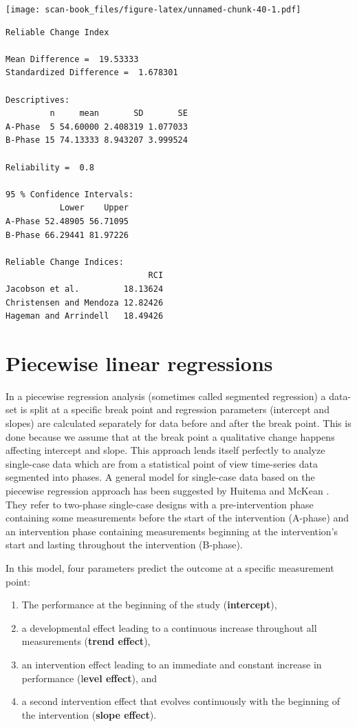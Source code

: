 \documentclass[
]{book}
\begin{document}
\texttt{[image: scan-book\_files/figure-latex/unnamed-chunk-40-1.pdf]}

\begin{verbatim}
Reliable Change Index

Mean Difference =  19.53333 
Standardized Difference =  1.678301 

Descriptives:
         n     mean       SD       SE
A-Phase  5 54.60000 2.408319 1.077033
B-Phase 15 74.13333 8.943207 3.999524

Reliability =  0.8 

95 % Confidence Intervals:
           Lower    Upper
A-Phase 52.48905 56.71095
B-Phase 66.29441 81.97226

Reliable Change Indices:
                             RCI
Jacobson et al.         18.13624
Christensen and Mendoza 12.82426
Hageman and Arrindell   18.49426
\end{verbatim}

\hypertarget{piecewise-linear-regressions}{%
\chapter{Piecewise linear regressions}\label{piecewise-linear-regressions}}

In a piecewise regression analysis (sometimes called segmented regression) a data-set is split at a specific break point and regression parameters (intercept and slopes) are calculated separately for data before and after the break point. This is done because we assume that at the break point a qualitative change happens affecting intercept and slope. This approach lends itself perfectly to analyze single-case data which are from a statistical point of view time-series data segmented into phases. A general model for single-case data based on the piecewise regression approach has been suggested by Huitema and McKean \citet{huitema_design_2000}. They refer to two-phase single-case designs with a pre-intervention phase containing some measurements before the start of the intervention (A-phase) and an intervention phase containing measurements beginning at the intervention's start and lasting throughout the intervention (B-phase).

In this model, four parameters predict the outcome at a specific measurement point:

\begin{enumerate}
\def\labelenumi{\arabic{enumi}.}
\item
  The performance at the beginning of the study (\textbf{intercept}),
\item
  a developmental effect leading to a continuous increase throughout all measurements (\textbf{trend effect}),
\item
  an intervention effect leading to an immediate and constant increase in performance (l\textbf{evel effect}), and
\item
  a second intervention effect that evolves continuously with the beginning of the intervention (\textbf{slope effect}).
\end{enumerate}
\end{document}
